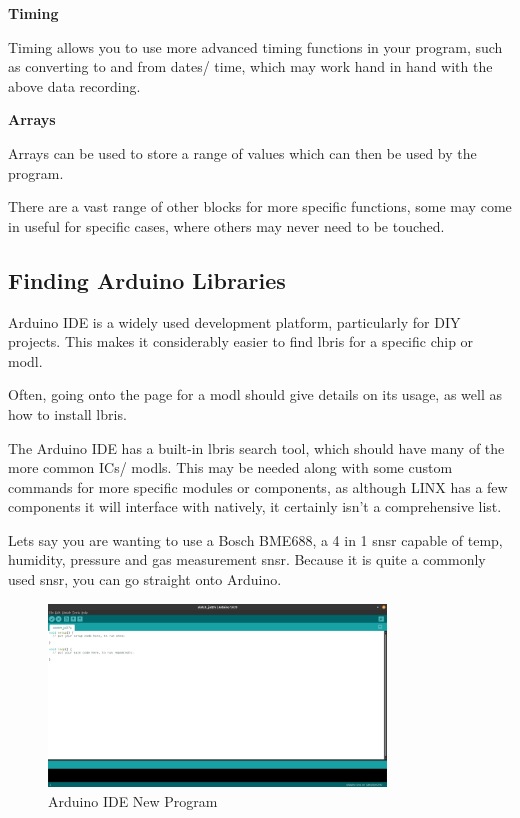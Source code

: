 \documentclass[a4paper,11pt]{report}
\begin{document}
\textbf{Timing}

Timing allows you to use more advanced timing functions in your program, such as converting to and from dates/ time, which may work hand in hand with the above data recording.

\textbf{Arrays}

Arrays can be used to store a range of values which can then be used by the program.

There are a vast range of other blocks for more specific functions, some may come in useful for specific cases, where others may never need to be touched.

\subsection{Finding Arduino Libraries}

Arduino IDE is a widely used development platform, particularly for DIY projects. This makes it considerably easier to find \gls{lbris} for a specific chip or \gls{modl}.

Often, going onto the page for a \gls{modl} should give details on its usage, as well as how to install \gls{lbris}.

The Arduino IDE has a built-in \gls{lbris} search tool, which should have many of the more common ICs/ \gls{modl}s. This may be needed along with some custom commands for more specific modules or components, as although LINX has a few components it will interface with natively, it certainly isn't a comprehensive list.

Lets say you are wanting to use a Bosch BME688, a 4 in 1 \gls{snsr} capable of temp, humidity, pressure and gas measurement \gls{snsr}. Because it is quite a commonly used \gls{snsr}, you can go straight onto Arduino.

\begin{figure}[H]
\centering
\includegraphics[width=0.8\textwidth]{screenshots/arduinoidestartup}
\caption{Arduino IDE New Program}
\end{figure}
\end{document}
